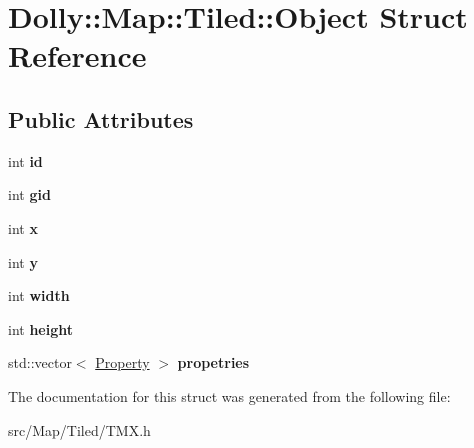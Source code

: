 \hypertarget{struct_dolly_1_1_map_1_1_tiled_1_1_object}{}\section{Dolly\+:\+:Map\+:\+:Tiled\+:\+:Object Struct Reference}
\label{struct_dolly_1_1_map_1_1_tiled_1_1_object}
\subsection*{Public Attributes}
\begin{DoxyCompactItemize}
\item 
\mbox{\label{struct_dolly_1_1_map_1_1_tiled_1_1_object_ade63c5e1a08765db69d92962b3890d25}} 
int {\bfseries id}
\item 
\mbox{\label{struct_dolly_1_1_map_1_1_tiled_1_1_object_a53e580d113670efd701199f46dba43a7}} 
int {\bfseries gid}
\item 
\mbox{\label{struct_dolly_1_1_map_1_1_tiled_1_1_object_a760e7c0de17bcf6664ab9fc63a56fe54}} 
int {\bfseries x}
\item 
\mbox{\label{struct_dolly_1_1_map_1_1_tiled_1_1_object_a54003fd13aa63bb65bc0271af4fe5683}} 
int {\bfseries y}
\item 
\mbox{\label{struct_dolly_1_1_map_1_1_tiled_1_1_object_a46d518b96dbed114dbb752f6bb45716a}} 
int {\bfseries width}
\item 
\mbox{\label{struct_dolly_1_1_map_1_1_tiled_1_1_object_a9967e41fd195f795a66906a5c92002a0}} 
int {\bfseries height}
\item 
\mbox{\label{struct_dolly_1_1_map_1_1_tiled_1_1_object_aeb17b040d4d67f532dc0df5f1e3c4ac7}} 
std\+::vector$<$ \hyperlink{struct_dolly_1_1_map_1_1_tiled_1_1_property}{Property} $>$ {\bfseries propetries}
\end{DoxyCompactItemize}


The documentation for this struct was generated from the following file\+:\begin{DoxyCompactItemize}
\item 
src/\+Map/\+Tiled/T\+M\+X.\+h\end{DoxyCompactItemize}
